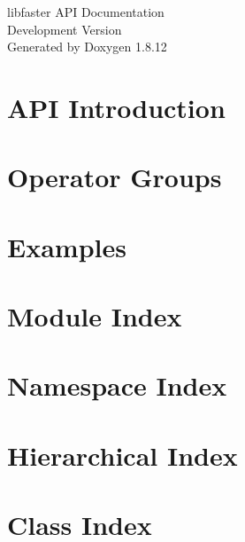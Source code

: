 \documentclass[twoside]{book}
\newcommand{\+}{\discretionary{\mbox{\scriptsize$\hookleftarrow$}}{}{}}
\newcommand{\clearemptydoublepage}{%
  \newpage{\pagestyle{empty}\cleardoublepage}%
}
\begin{document}
\hypersetup{pageanchor=false,
             bookmarksnumbered=true,
             pdfencoding=unicode
            }
\begin{titlepage}
\vspace*{7cm}
\begin{center}%
{\Large libfaster A\+PI Documentation \\[1ex]\large Development Version }\\
\vspace*{1cm}
{\large Generated by Doxygen 1.8.12}\\
\end{center}
\end{titlepage}
\clearemptydoublepage
{}
\tableofcontents
\clearemptydoublepage
{}
\hypersetup{pageanchor=true}

\chapter{A\+PI Introduction}
\label{index}\hypertarget{index}{}
\chapter{Operator Groups}
\label{md__home_mtcs_pesquisa_faster_faster_8git_src_DOC_GROUPS}
\hypertarget{md__home_mtcs_pesquisa_faster_faster_8git_src_DOC_GROUPS}{}

\chapter{Examples}
\label{examples}
\hypertarget{examples}{}

\chapter{Module Index}

\chapter{Namespace Index}

\chapter{Hierarchical Index}

\chapter{Class Index}

\end{document}
